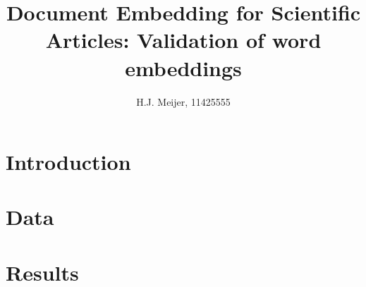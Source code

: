 \documentclass[10pt,a4paper]{article}
\newcommand{\mainheader}[1]{\section{#1}}
\begin{document}
\begin{titlepage}
\title{Document Embedding for Scientific Articles: Validation of word embeddings}
\author{H.J. Meijer, 11425555}
\clearpage\maketitle\thispagestyle{empty}

\end{titlepage}

\mainheader{Introduction}


\clearpage

\clearpage

\clearpage

\mainheader{Data}

\clearpage

\mainheader{Results}

\clearpage



\clearpage



\end{document}
